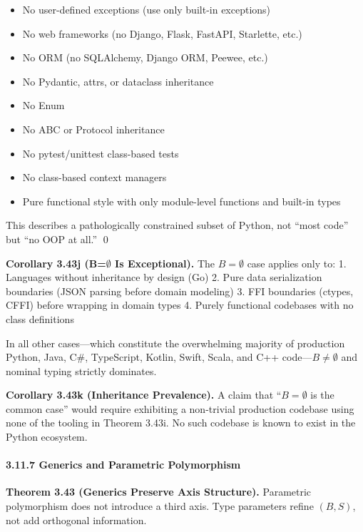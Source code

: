 \begin{itemize}
\tightlist
\item
  No user-defined exceptions (use only built-in exceptions)
\item
  No web frameworks (no Django, Flask, FastAPI, Starlette, etc.)
\item
  No ORM (no SQLAlchemy, Django ORM, Peewee, etc.)
\item
  No Pydantic, attrs, or dataclass inheritance
\item
  No Enum
\item
  No ABC or Protocol inheritance
\item
  No pytest/unittest class-based tests
\item
  No class-based context managers
\item
  Pure functional style with only module-level functions and built-in
  types
\end{itemize}

This describes a pathologically constrained subset of Python, not
``most code'' but ``no OOP at all.'' \qed

\textbf{Corollary 3.43j (B=$\emptyset$ Is Exceptional).} The \(B = \emptyset\)
case applies only to: 1. Languages without inheritance by design (Go) 2.
Pure data serialization boundaries (JSON parsing before domain modeling)
3. FFI boundaries (ctypes, CFFI) before wrapping in domain types 4.
Purely functional codebases with no class definitions

In all other cases---which constitute the overwhelming majority of
production Python, Java, C\#, TypeScript, Kotlin, Swift, Scala, and C++
code---\(B \neq \emptyset\) and nominal typing strictly dominates.

\textbf{Corollary 3.43k (Inheritance Prevalence).} A claim that
``\(B = \emptyset\) is the common case'' would require exhibiting a non-trivial
production codebase using none of the tooling in Theorem 3.43i. No such
codebase is known to exist in the Python ecosystem.

\paragraph{3.11.7 Generics and Parametric
Polymorphism}\label{generics-and-parametric-polymorphism}

\textbf{Theorem 3.43 (Generics Preserve Axis Structure).} Parametric
polymorphism does not introduce a third axis. Type parameters refine
$(B, S)$, not add orthogonal information.

